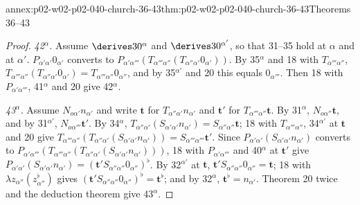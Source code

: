\begin{annexitem}{annex:p02-w02-p02-040-church-36-43}{thm:p02-w02-p02-040-church-36-43}{Theorems 36--43}
\begin{proof}
\emph{42\(^\alpha\).}  Assume \(\derives30^\alpha\) and \(\derives30^{\alpha'}\), so
that 31--35 hold at \(\alpha\) and at \(\alpha'\).  \(P_{\alpha'\alpha'}0_{\alpha'}\)
converts to \(P_{\alpha'\alpha'''}(T_{\alpha'''\alpha''}(T_{\alpha''\alpha'}0_{\alpha'}))\).
By 35\(^\alpha\) and 18 with \(T_{\alpha'''\alpha''}\),
\(T_{\alpha'''\alpha''}(T_{\alpha''\alpha'}0_{\alpha'})=T_{\alpha'''\alpha''}0_{\alpha''}\),
and by 35\(^{\alpha'}\) and 20 this equals \(0_{\alpha'''}\).  Then 18 with
\(P_{\alpha'\alpha'''}\), 41\(^\alpha\) and 20 give 42\(^\alpha\).

\emph{43\(^\alpha\).}  Assume \(N_{o\alpha'}n_{\alpha'}\) and write \(\mathbf t\) for
\(T_{\alpha''\alpha'}n_{\alpha'}\) and \(\mathbf t'\) for \(T_{\alpha'''\alpha''}\mathbf t\).
By 31\(^\alpha\), \(N_{o\alpha''}\mathbf t\), and by 31\(^{\alpha'}\),
\(N_{o\alpha'''}\mathbf t'\).  By 34\(^\alpha\),
\(T_{\alpha''\alpha'}(S_{\alpha'\alpha'}n_{\alpha'})=S_{\alpha''\alpha''}\mathbf t\);
18 with \(T_{\alpha'''\alpha''}\), 34\(^{\alpha'}\) at \(\mathbf t\) and 20 give
\(T_{\alpha'''\alpha''}(T_{\alpha''\alpha'}(S_{\alpha'\alpha'}n_{\alpha'}))=S_{\alpha'''\alpha'''}\mathbf t'\).
Since \(P_{\alpha'\alpha'}(S_{\alpha'\alpha'}n_{\alpha'})\) converts to
\(P_{\alpha'\alpha'''}(T_{\alpha'''\alpha''}(T_{\alpha''\alpha'}(S_{\alpha'\alpha'}n_{\alpha'})))\),
18 with \(P_{\alpha'\alpha'''}\) and 40\(^\alpha\) at \(\mathbf t'\) give
\(P_{\alpha'\alpha'}(S_{\alpha'\alpha'}n_{\alpha'})=(\mathbf t'S_{\alpha''\alpha''}0_{\alpha''})^\flat\).
By 32\(^{\alpha'}\) at \(\mathbf t\),
\(\mathbf t'S_{\alpha''\alpha''}0_{\alpha''}=\mathbf t\); 18 with
\(\lambda z_{\alpha''}(z_{\alpha''}^\flat)\) gives
\((\mathbf t'S_{\alpha''\alpha''}0_{\alpha''})^\flat=\mathbf t^\flat\); and by
32\(^\alpha\), \(\mathbf t^\flat=n_{\alpha'}\).  Theorem 20 twice and the deduction
theorem give 43\(^\alpha\).
\end{proof}
\end{annexitem}

